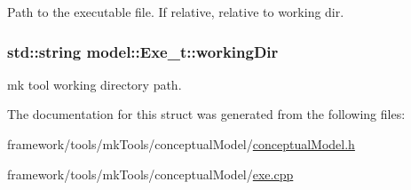 Path to the executable file. If relative, relative to working dir. 

\subsubsection[{\texorpdfstring{working\+Dir}{workingDir}}]{\setlength{\rightskip}{0pt plus 5cm}std\+::string model\+::\+Exe\+\_\+t\+::working\+Dir}\hypertarget{structmodel_1_1_exe__t_a3356bfd82375ed963020e7239c84d955}{}\label{structmodel_1_1_exe__t_a3356bfd82375ed963020e7239c84d955}


mk tool working directory path. 



The documentation for this struct was generated from the following files\+:\begin{DoxyCompactItemize}
\item 
framework/tools/mk\+Tools/conceptual\+Model/\hyperlink{conceptual_model_8h}{conceptual\+Model.\+h}\item 
framework/tools/mk\+Tools/conceptual\+Model/\hyperlink{exe_8cpp}{exe.\+cpp}\end{DoxyCompactItemize}
